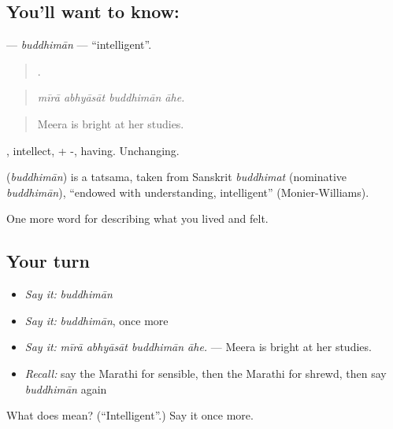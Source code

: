 \subsection*{You'll want to know: }
\textbf{} — \emph{buddhimān} — \textquotedblleft{}intelligent\textquotedblright{}.

\begin{quote}
   .
\end{quote}

\begin{quote}
\emph{mīrā abhyāsāt buddhimān āhe.}
\end{quote}

\begin{quote}
Meera is bright at her studies.
\end{quote}

, intellect, + -, having. Unchanging.

\begin{cousinweb}
\textbf{} (\emph{buddhimān}) is a tatsama, taken from Sanskrit \emph{buddhimat} (nominative \emph{buddhimān}), \textquotedblleft{}endowed with understanding, intelligent\textquotedblright{} (Monier-Williams).
\end{cousinweb}

\begin{grammarlens}[title={What you've built}]
One more word for describing what you lived and felt.
\end{grammarlens}

\subsection*{Your turn}
\begin{itemize}
\raggedright
  \item \emph{Say it:} \emph{buddhimān}
  \item \emph{Say it:} \emph{buddhimān}, once more
  \item \emph{Say it:} \emph{mīrā abhyāsāt buddhimān āhe.} — Meera is bright at her studies.
  \item \emph{Recall:} say the Marathi for sensible, then the Marathi for shrewd, then say \emph{buddhimān} again
\end{itemize}

\begin{tcolorbox}[breakable,colback=teal!4,colframe=teal!35!black,title={Before you move on}]
What does  mean? (\textquotedblleft{}Intelligent\textquotedblright{}.) Say it once more.
\end{tcolorbox}
